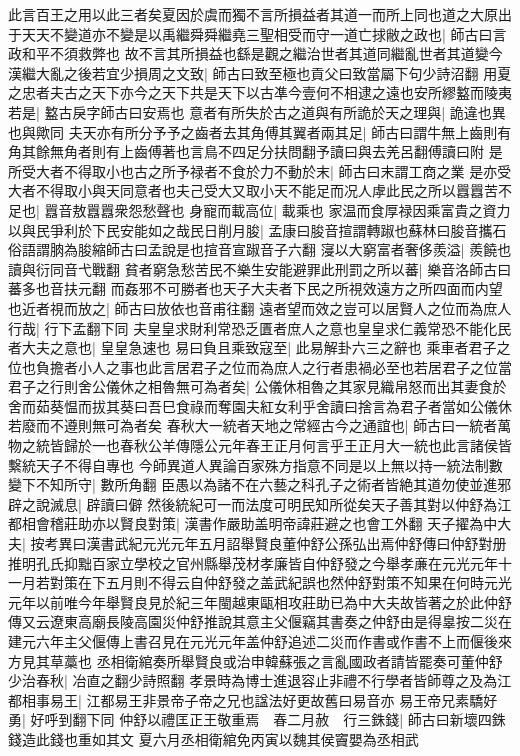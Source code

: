 此言百王之用以此三者矣夏因於虞而獨不言所損益者其道一而所上同也道之大原出于天天不變道亦不變是以禹繼舜舜繼堯三聖相受而守一道亡捄敝之政也|{
	師古曰言政和平不須救弊也}
故不言其所損益也繇是觀之繼治世者其道同繼亂世者其道變今漢繼大亂之後若宜少損周之文致|{
	師古曰致至極也貢父曰致當屬下句少詩沼翻}
用夏之忠者夫古之天下亦今之天下共是天下以古凖今壹何不相逮之遠也安所繆盭而陵夷若是|{
	盭古戾字師古曰安焉也}
意者有所失於古之道與有所詭於天之理與|{
	詭違也異也與歟同}
夫天亦有所分予予之齒者去其角傅其翼者兩其足|{
	師古曰謂牛無上齒則有角其餘無角者則有上齒傅著也言鳥不四足分扶問翻予讀曰與去羌呂翻傅讀曰附}
是所受大者不得取小也古之所予禄者不食於力不動於末|{
	師古曰末謂工商之業}
是亦受大者不得取小與天同意者也夫己受大又取小天不能足而况人虖此民之所以囂囂苦不足也|{
	囂音敖囂囂衆怨愁聲也}
身寵而載高位|{
	載乘也}
家温而食厚禄因乘富貴之資力以與民爭利於下民安能如之哉民日削月朘|{
	孟康曰朘音揎謂轉踧也蘇林曰朘音攜石俗語謂朒為朘縮師古曰孟說是也揎音宣踧音子六翻}
寖以大窮富者奢侈羨溢|{
	羨饒也讀與衍同音弋戰翻}
貧者窮急愁苦民不樂生安能避罪此刑罰之所以蕃|{
	樂音洛師古曰蕃多也音扶元翻}
而姦邪不可勝者也天子大夫者下民之所視效遠方之所四面而内望也近者視而放之|{
	師古曰放依也音甫往翻}
遠者望而效之豈可以居賢人之位而為庶人行哉|{
	行下孟翻下同}
夫皇皇求財利常恐乏匱者庶人之意也皇皇求仁義常恐不能化民者大夫之意也|{
	皇皇急速也}
易曰負且乘致寇至|{
	此易解卦六三之辭也}
乘車者君子之位也負擔者小人之事也此言居君子之位而為庶人之行者患禍必至也若居君子之位當君子之行則舍公儀休之相魯無可為者矣|{
	公儀休相魯之其家見織帛怒而出其妻食於舍而茹葵愠而拔其葵曰吾巳食祿而奪園夫紅女利乎舍讀曰捨言為君子者當如公儀休若廢而不遵則無可為者矣}
春秋大一統者天地之常經古今之通誼也|{
	師古曰一統者萬物之統皆歸於一也春秋公羊傳隱公元年春王正月何言乎王正月大一統也此言諸侯皆繫統天子不得自專也}
今師異道人異論百家殊方指意不同是以上無以持一統法制數變下不知所守|{
	數所角翻}
臣愚以為諸不在六藝之科孔子之術者皆絶其道勿使並進邪辟之說滅息|{
	辟讀曰僻}
然後統紀可一而法度可明民知所從矣天子善其對以仲舒為江都相會稽莊助亦以賢良對策|{
	漢書作嚴助盖明帝諱莊避之也會工外翻}
天子擢為中大夫|{
	按考異曰漢書武紀元光元年五月詔舉賢良董仲舒公孫弘出焉仲舒傳曰仲舒對册推明孔氏抑黜百家立學校之官州縣舉茂材孝廉皆自仲舒發之今舉孝亷在元光元年十一月若對策在下五月則不得云自仲舒發之盖武紀誤也然仲舒對策不知果在何時元光元年以前唯今年舉賢良見於紀三年閩越東甌相攻莊助已為中大夫故皆著之於此仲舒傳又云遼東高廟長陵高園災仲舒推說其意主父偃竊其書奏之仲舒由是得辠按二災在建元六年主父偃傳上書召見在元光元年盖仲舒追述二災而作書或作書不上而偃後來方見其草藁也}
丞相衛綰奏所舉賢良或治申韓蘇張之言亂國政者請皆罷奏可董仲舒少治春秋|{
	冶直之翻少詩照翻}
孝景時為博士進退容止非禮不行學者皆師尊之及為江都相事易王|{
	江都易王非景帝子帝之兄也諡法好更故舊曰易音亦}
易王帝兄素驕好勇|{
	好呼到翻下同}
仲舒以禮匡正王敬重焉　春二月赦　行三銖錢|{
	師古曰新壞四銖錢造此錢也重如其文}
夏六月丞相衛綰免丙寅以魏其侯竇嬰為丞相武

